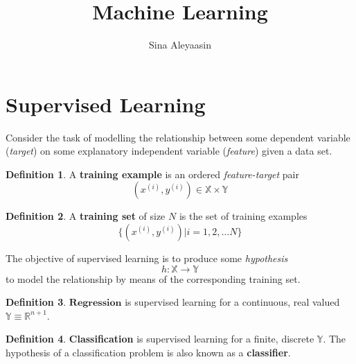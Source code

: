 \documentclass{article}
\title{Machine Learning}
\author{Sina Aleyaasin}
\theoremstyle{definition}
\newtheorem{definition}{Definition}[section]
\theoremstyle{remark}
\begin{document}
\maketitle

\section{Supervised Learning}
Consider the task of modelling the relationship between some dependent variable (\textit{target}) on some explanatory independent variable (\textit{feature}) given a data set.
\begin{definition}
A \textbf{training example} is an ordered \textit{feature-target} pair 
    \begin{equation}
    (x^{(i)}, y^{(i)}) \in \mathbb{X} \times \mathbb{Y}
    \end{equation}
\end{definition}
\begin{definition}
A \textbf{training set} of size $N$ is the set of training examples 
\begin{equation}
    \{(x^{(i)}, y^{(i)})| i = 1, 2, \dots N\}
\end{equation}
\end{definition}
The objective of supervised learning is to produce some \textit{hypothesis} 
\begin{equation}
    h : \mathbb{X} \rightarrow \mathbb{Y}
\end{equation}
to model the relationship by means of the corresponding training set.
\begin{definition}
$\mathbf{Regression}$ is supervised learning for a continuous, real valued $\mathbb{Y} \equiv \mathbb{R}^{n+1}$.
\end{definition}
\begin{definition}
\textbf{Classification} is supervised learning for a finite, discrete $\mathbb{Y}$. The hypothesis of a classification problem is also known as a \textbf{classifier}.
\end{definition}
\end{document}
